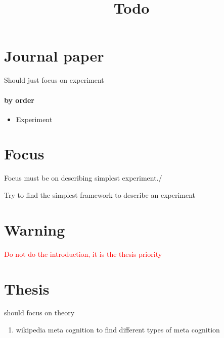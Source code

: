 \documentclass[a4paper]{article}
\title{Todo}
\date{}
\begin{document}
    \maketitle
    
    
    \section{Journal paper}
    Should just focus on experiment
        
    \paragraph{by order}
        \begin{itemize}
            \item Experiment
        \end{itemize}
    
    
    \section{Focus}
    Focus must be on describing simplest experiment./
    
    Try to find the simplest framework to describe an experiment
    
    
    \section{Warning}
    \textcolor{red}{Do not do the introduction, it is the thesis priority}
    
    \section{Thesis}
    should focus on theory
    
    \begin{enumerate}
        \item wikipedia meta cognition to find different types of meta cognition
    \end{enumerate}
    
\end{document}
